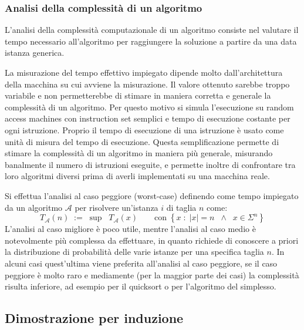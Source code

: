 \subsubsection*{Analisi della complessità di un algoritmo}
L'analisi della complessità computazionale di un algoritmo consiste nel valutare il tempo necessario all'algoritmo per
raggiungere la soluzione a partire da una data istanza generica.

La misurazione del tempo effettivo impiegato dipende molto dall'architettura della macchina su cui avviene la misurazione.
Il valore ottenuto sarebbe troppo variabile e non permetterebbe di stimare in maniera corretta e generale la complessità
di un algoritmo. Per questo motivo si simula l'esecuzione su random access machines con instruction set semplici e tempo
di esecuzione costante per ogni istruzione. Proprio il tempo di esecuzione di una istruzione è usato come unità di misura
del tempo di esecuzione. Questa semplificazione permette di stimare la complessità di un algoritmo in maniera più
generale, misurando banalmente il numero di istruzioni eseguite, e permette inoltre di confrontare tra loro algoritmi diversi
prima di averli implementati su una macchina reale.

Si effettua l'analisi al caso peggiore (worst-case) definendo come tempo impiegato da un algoritmo \(\mathcal{A}\) per
risolvere un'istanza \(i\) di taglia \(n\) come:
\[T_\mathcal{A}(n) \; := \; \sup \;\; T_\mathcal{A}(x) \qquad \text{con} \; \left\{ x \; : \; |x| = n \;\; \wedge \;\; x \in \Sigma^n \right\}\]
L'analisi al caso migliore è poco utile, mentre l'analisi al caso medio è notevolmente più complessa da effettuare, in quanto
richiede di conoscere a priori la distribuzione di probabilità delle varie istanze per una specifica taglia \(n\). In alcuni
casi quest'ultima viene preferita all'analisi al caso peggiore, se il caso peggiore è molto raro e mediamente (per la maggior
parte dei casi) la complessità risulta inferiore, ad esempio per il quicksort o per l'algoritmo del simplesso.

\newpage

\subsection{Dimostrazione per induzione}
